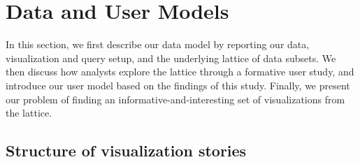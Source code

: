 \section{Data and User Models\label{sec:datamodel}}

In this section, we first describe our data model by reporting our data, visualization and query setup, and the underlying lattice of data subsets. We then discuss how analysts explore the lattice through a formative user study, and introduce our user model based on the findings of this study. Finally, we present our problem of finding an informative-and-interesting set of visualizations from the lattice.

\subsection{Structure of visualization stories\label{sec:structure}}




